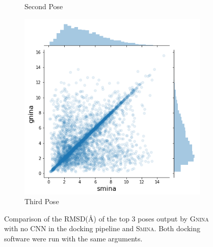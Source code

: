 \documentclass[journal=jcisd8,manuscript=article]{achemso}
\begin{document}
\begin{figure}
\begin{subfigure}[b]{0.32\textwidth}
        \caption{Second Pose}
        \label{fig:SminaCompareTwo}
    \end{subfigure}
    \begin{subfigure}[b]{0.32\textwidth}
        \centering
        \includegraphics[width=\textwidth]{figures/thirdpose.png}
        \caption{Third Pose}
        \label{fig:SminaComparePose}
    \end{subfigure}
    \caption{Comparison of the RMSD(\AA) of the top 3 poses output by \textsc{Gnina} with no CNN in the docking pipeline and \textsc{Smina}. Both docking software were run with the same arguments.}
    \label{fig:SminaComparePose}
\end{figure}
\end{document}
